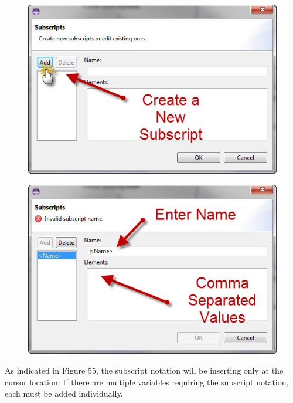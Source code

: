 \documentclass[11pt]{amsart}
\begin{document}
\begin{figure}[ht]
\begin{center}
\vspace{.2in}
\centerline {
\includegraphics[totalheight=0.3\textheight]{images/053.jpg}
}
\caption{}
\label{fig:053}
\end{center}
\end{figure}


\begin{figure}[ht]
\begin{center}
\vspace{.2in}
\centerline {
\includegraphics[totalheight=0.3\textheight]{images/054.jpg}
}
\caption{}
\label{fig:054}
\end{center}
\end{figure}

As indicated in Figure 55, the subscript notation will be inserting only at the cursor location. If there are multiple variables requiring the subscript notation, each must be added individually.
\end{document}
